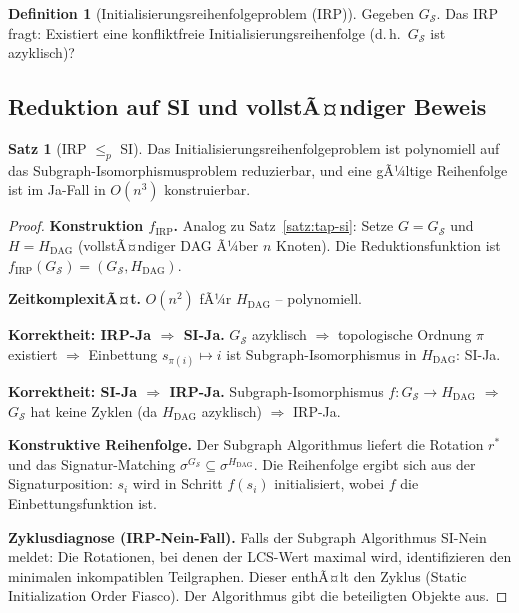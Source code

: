 ﻿\documentclass[a4paper,12pt]{article}
\theoremstyle{definition}
\newtheorem{definition}{Definition}
\newtheorem{satz}{Satz}
\begin{document}
\begin{definition}[Initialisierungsreihenfolgeproblem (IRP)]
\label{def:irp}
Gegeben $G_{\mathcal{S}}$. Das IRP fragt: Existiert eine konfliktfreie Initialisierungsreihenfolge (d.\,h.\ $G_{\mathcal{S}}$ ist azyklisch)?
\end{definition}

\subsection{Reduktion auf SI und vollstÃ¤ndiger Beweis}

\begin{satz}[IRP $\leq_p$ SI]
\label{satz:irp-si}
Das Initialisierungsreihenfolgeproblem ist polynomiell auf das Subgraph-Isomorphismusproblem reduzierbar, und eine gÃ¼ltige Reihenfolge ist im Ja-Fall in $O(n^3)$ konstruierbar.
\end{satz}

\begin{proof}
\textbf{Konstruktion $f_{\text{IRP}}$.}
Analog zu Satz~\ref{satz:tap-si}: Setze $G = G_{\mathcal{S}}$ und $H = H_{\text{DAG}}$ (vollstÃ¤n\-diger DAG Ã¼ber $n$ Knoten). Die Reduktionsfunktion ist $f_{\text{IRP}}(G_{\mathcal{S}}) = (G_{\mathcal{S}}, H_{\text{DAG}})$.

\textbf{ZeitkomplexitÃ¤t.} $O(n^2)$ fÃ¼r $H_{\text{DAG}}$ -- polynomiell.

\textbf{Korrektheit: IRP-Ja $\Rightarrow$ SI-Ja.}
$G_{\mathcal{S}}$ azyklisch $\Rightarrow$ topologische Ordnung $\pi$ existiert $\Rightarrow$ Einbettung $s_{\pi(i)} \mapsto i$ ist Subgraph-Isomorphismus in $H_{\text{DAG}}$: SI-Ja.

\textbf{Korrektheit: SI-Ja $\Rightarrow$ IRP-Ja.}
Subgraph-Isomorphismus $f: G_{\mathcal{S}} \to H_{\text{DAG}}$ $\Rightarrow$ $G_{\mathcal{S}}$ hat keine Zyklen (da $H_{\text{DAG}}$ azyklisch) $\Rightarrow$ IRP-Ja.

\textbf{Konstruktive Reihenfolge.}
Der Subgraph Algorithmus liefert die Rotation $r^*$ und das Signatur-Matching $\sigma^{G_{\mathcal{S}}} \subseteq \sigma^{H_{\text{DAG}}}$. Die Reihenfolge ergibt sich aus der Signaturposition: $s_i$ wird in Schritt $f(s_i)$ initialisiert, wobei $f$ die Einbettungsfunktion ist.

\textbf{Zyklusdiagnose (IRP-Nein-Fall).}
Falls der Subgraph Algorithmus SI-Nein meldet: Die Rotationen, bei denen der LCS-Wert maximal wird, identifizieren den minimalen inkompatiblen Teilgraphen. Dieser enthÃ¤lt den Zyklus (Static Initialization Order Fiasco). Der Algorithmus gibt die beteiligten Objekte aus.
\end{proof}
\end{document}
